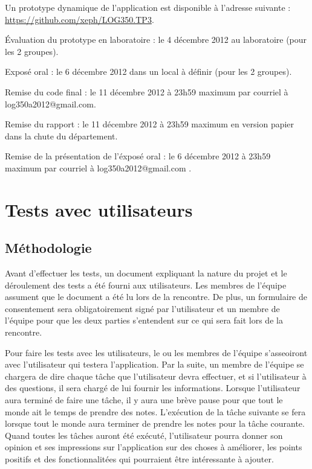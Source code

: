 \documentclass[letterpaper, oneside, 12pt, these, creativecommons]{thETS}
\begin{document}
Un prototype dynamique de l'application est disponible à l'adresse suivante : \\
\url{https://github.com/xeph/LOG350.TP3}.

Évaluation du prototype en laboratoire  : le 4 décembre 2012 au laboratoire (pour les 2 groupes).

Exposé oral  : le 6 décembre 2012 dans un local à définir (pour les 2 groupes).

Remise du code final : le 11 décembre 2012 à 23h59 maximum par courriel à log350a2012@gmail.com.

Remise du rapport :  le 11 décembre 2012 à 23h59 maximum en version papier dans la chute du département.

Remise de la présentation de l’éxposé oral : le 6 décembre 2012 à 23h59 maximum par courriel à log350a2012@gmail.com .

\chapter{Tests avec utilisateurs}

\section{Méthodologie}

Avant d'effectuer les tests, un document expliquant la nature du projet et le déroulement des tests a été fourni aux utilisateurs. Les membres de l'équipe assument que le document a été lu lors de la rencontre. De plus, un formulaire de consentement sera obligatoirement signé par l'utilisateur et un membre de l'équipe pour que les deux parties s'entendent sur ce qui sera fait lors de la rencontre.

Pour faire les tests avec les utilisateurs, le ou les membres de l'équipe s'asseoiront avec l'utilisateur qui testera l'application. Par la suite, un membre de l'équipe se chargera de dire chaque tâche que l'utilisateur devra effectuer, et si l'utilisateur à des questions, il sera chargé de lui fournir les informations. Lorsque l'utilisateur aura terminé de faire une tâche, il y aura une brève pause pour que tout le monde ait le temps de prendre des notes. L'exécution de la tâche suivante se fera lorsque tout le monde aura terminer de prendre les notes pour la tâche courante. Quand toutes les tâches auront été exécuté, l'utilisateur pourra donner son opinion et ses impressions sur l'application sur des choses à améliorer, les points positifs et des fonctionnalitées qui pourraient être intéressante à ajouter.
\end{document}
